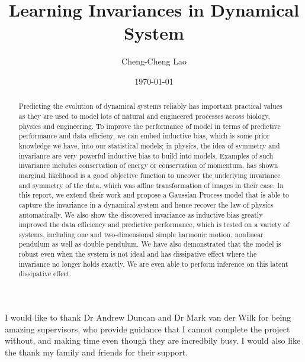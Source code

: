 \documentclass{statsmsc}
\title{Learning Invariances in Dynamical System}
\author{Cheng-Cheng Lao}
\date{\today}
\begin{document}
\maketitle


\declarationdate{\today}
\declaration 


\begin{abstract}
Predicting the evolution of dynamical systems reliably has important practical values as they are used to model lots of natural and engineered processes across biology, physics and engineering.
To improve the performance of model in terms of predictive performance and data efficieny, we can embed inductive bias, which is some prior knowledge we have, into our statistical models; in physics, the idea of symmetry and invariance are very powerful inductive bias to build into models.
Examples of such invariance includes conservation of energy or conservation of momentum.
\cite{Mark2017} has shown marginal likelihood is a good objective function to uncover the underlying invariance and symmetry of the data, which was affine transformation of images in their case. 
In this report, we extend their work and propose a Gaussian Process model that is able to capture the invariance in a dynamical system and hence recover the law of physics automatically.
We also show the discovered invariance as inductive bias greatly improved the data efficiency and predictive performance, which is tested on a variety of systems, including one and two-dimensional simple harmonic motion, nonlinear pendulum as well as double pendulum.
We have also demonstrated that the model is robust even when the system is not ideal and has dissipative effect where the invariance no longer holds exactly. 
We are even able to perform inference on this latent dissipative effect.
\end{abstract}

\begin{acknowledgements}
I would like to thank Dr Andrew Duncan and Dr Mark van der Wilk for being amazing supervisors, who provide guidance that I cannot complete the project without, and making time even though they are incredbily busy. 
I would also like the thank my family and friends for their support.

\end{acknowledgements}


\mainmatter
\tableofcontents
\end{document}
